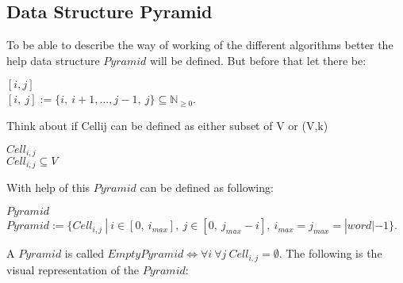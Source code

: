 \subsection{Data Structure Pyramid}

To be able to describe the way of working of the different algorithms better the help data structure $Pyramid$ will be defined. But before that let there be:
\begin{DefGrey} \textbf{$[i, j]$} \\
	$[i,\ j] := \{i,\ i+1,..., j-1,\ j\} \subseteq \mathbb{N}_{\geq 0}$.
\end{DefGrey}
\noindent Think about if Cellij can be defined as either subset of V or (V,k)
\begin{DefGrey} \textbf{$Cell_{i,j}$} \\
	$Cell_{i,j} \subseteq V$
\end{DefGrey}
\noindent With help of this $Pyramid$ can be defined as following:
\begin{DefGrey} \textbf{$Pyramid$} \\
	$Pyramid :=\{ Cell_{i,j}\ |\ i \in [0,\ i_{max}],\  j \in [0,\ j_{max}-i],\ i_{max} = j_{max} = |word|-1\}$.
\end{DefGrey}
\noindent A $Pyramid$ is called $EmptyPyramid \Leftrightarrow \forall i\ \forall j\ Cell_{i,j}=\emptyset$. \noindent The following is the visual representation of the $Pyramid$:
\newcommand{\boxpyramid}[1]{
	\fontsize{5}{12}\selectfont{#1}
}
